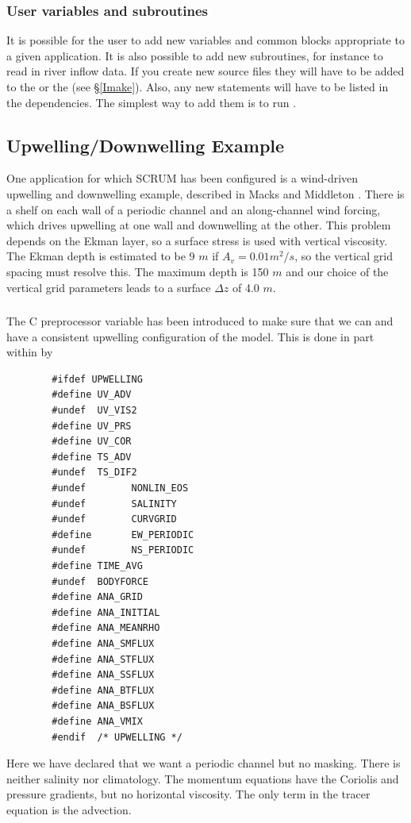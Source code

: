 \subsubsection{User variables and subroutines}
\label{Store}
It is possible for the user to add new variables and common blocks
appropriate to a given application.  It is also possible to add
new subroutines, for instance to read in river inflow data.  If
you create new source files they will have to be added to the
 or the  (see \S\ref{Imake}).  Also,
any new  statements will have to
be listed in the  dependencies.  The simplest way
to add them is to run .

\subsection{Upwelling/Downwelling Example}
\label{UpDown}
One application for which SCRUM has been configured is a wind-driven
upwelling and downwelling example, described in Macks and Middleton
\cite{Macks93}.  There is a shelf on each wall of a periodic channel
and an along-channel wind forcing, which drives upwelling at one wall
and downwelling at the other.  This problem depends on the Ekman layer,
so a surface stress is used with vertical viscosity.  The Ekman depth
is estimated to be 9 $m$ if $A_v = 0.01 m^2 / s$, so the vertical grid
spacing must resolve this.  The maximum depth is 150 $m$ and our choice
of the vertical grid parameters leads to a surface $\Delta z$ of 4.0
$m$.

\subsubsection{}
The C preprocessor variable  has been introduced to
make sure that we can  and have a consistent
upwelling configuration of the model.  This is done in part
within  by
\begin{verbatim}
        #ifdef UPWELLING
        #define UV_ADV
        #undef  UV_VIS2 
        #define UV_PRS
        #define UV_COR
        #define TS_ADV
        #undef  TS_DIF2
        #undef        NONLIN_EOS
        #undef        SALINITY
        #undef        CURVGRID
        #define       EW_PERIODIC
        #undef        NS_PERIODIC
        #define TIME_AVG
        #undef  BODYFORCE
        #define ANA_GRID
        #define ANA_INITIAL
        #define ANA_MEANRHO
        #define ANA_SMFLUX
        #define ANA_STFLUX
        #define ANA_SSFLUX
        #define ANA_BTFLUX
        #define ANA_BSFLUX
        #define ANA_VMIX
        #endif  /* UPWELLING */
\end{verbatim}
Here we have declared that we want a periodic channel but no masking.
There is neither salinity nor climatology.  The momentum equations have
the Coriolis and pressure gradients, but no horizontal viscosity.  The
only term in the tracer equation is the advection.

